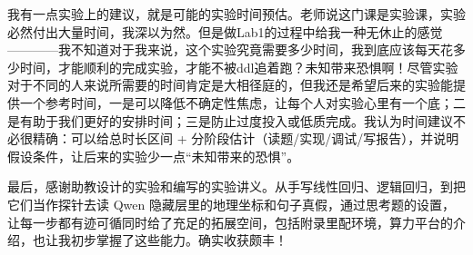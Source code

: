 \documentclass[UTF8,a4paper]{ctexart}
\begin{document}
我有一点实验上的建议，就是可能的实验时间预估。老师说这门课是实验课，实验必然付出大量时间，我深以为然。但是做Lab1的过程中给我一种无休止的感觉————我不知道对于我来说，这个实验究竟需要多少时间，我到底应该每天花多少时间，才能顺利的完成实验，才能不被ddl追着跑？未知带来恐惧啊！尽管实验对于不同的人来说所需要的时间肯定是大相径庭的，但我还是希望后来的实验能提供一个参考时间，一是可以降低不确定性焦虑，让每个人对实验心里有一个底；二是有助于我们更好的安排时间；三是防止过度投入或低质完成。我认为时间建议不必很精确：可以给总时长区间 + 分阶段估计（读题/实现/调试/写报告），并说明假设条件，让后来的实验少一点“未知带来的恐惧”。

最后，感谢助教设计的实验和编写的实验讲义。从手写线性回归、逻辑回归，到把它们当作探针去读 Qwen 隐藏层里的地理坐标和句子真假，通过思考题的设置，让每一步都有迹可循同时给了充足的拓展空间，包括附录里配环境，算力平台的介绍，也让我初步掌握了这些能力。确实收获颇丰！
\end{document}
